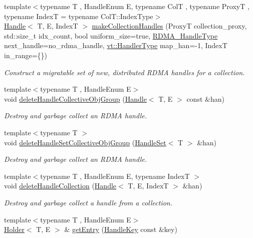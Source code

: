 \begin{DoxyCompactItemize}
{\footnotesize template$<$typename T , Handle\+Enum E, typename ColT , typename ProxyT , typename IndexT  = typename Col\+T\+::\+Index\+Type$>$ }\\\hyperlink{structvt_1_1rdma_1_1_handle}{Handle}$<$ T, E, IndexT $>$ \hyperlink{structvt_1_1rdma_1_1_manager_aad62be5c2cb0225139cf3d665b5fd7f2}{make\+Collection\+Handles} (ProxyT collection\+\_\+proxy, std\+::size\+\_\+t idx\+\_\+count, bool uniform\+\_\+size=true, \hyperlink{namespacevt_a10442579ec4e7ebef223818e64bcf908}{R\+D\+M\+A\+\_\+\+Handle\+Type} next\+\_\+handle=no\+\_\+rdma\+\_\+handle, \hyperlink{namespacevt_af64846b57dfcaf104da3ef6967917573}{vt\+::\+Handler\+Type} map\+\_\+han=-\/1, IndexT in\+\_\+range=\{\})
\begin{DoxyCompactList}\small\item\em Construct a migratable set of new, distributed R\+D\+MA handles for a collection. \end{DoxyCompactList}\item 
{\footnotesize template$<$typename T , Handle\+Enum E$>$ }\\void \hyperlink{structvt_1_1rdma_1_1_manager_a4219310feca011fd242e654c9ba51280}{delete\+Handle\+Collective\+Obj\+Group} (\hyperlink{structvt_1_1rdma_1_1_handle}{Handle}$<$ T, E $>$ const \&han)
\begin{DoxyCompactList}\small\item\em Destroy and garbage collect an R\+D\+MA handle. \end{DoxyCompactList}\item 
{\footnotesize template$<$typename T $>$ }\\void \hyperlink{structvt_1_1rdma_1_1_manager_a9b3b9bf148a8225295879481345e4af3}{delete\+Handle\+Set\+Collective\+Obj\+Group} (\hyperlink{structvt_1_1rdma_1_1_handle_set}{Handle\+Set}$<$ T $>$ \&han)
\begin{DoxyCompactList}\small\item\em Destroy and garbage collect an R\+D\+MA handle. \end{DoxyCompactList}\item 
{\footnotesize template$<$typename T , Handle\+Enum E, typename IndexT $>$ }\\void \hyperlink{structvt_1_1rdma_1_1_manager_a3a1f982e986d58e91837a2b1aa048468}{delete\+Handle\+Collection} (\hyperlink{structvt_1_1rdma_1_1_handle}{Handle}$<$ T, E, IndexT $>$ \&han)
\begin{DoxyCompactList}\small\item\em Destroy and garbage collect a handle from a collection. \end{DoxyCompactList}\item 
{\footnotesize template$<$typename T , Handle\+Enum E$>$ }\\\hyperlink{structvt_1_1rdma_1_1_holder}{Holder}$<$ T, E $>$ \& \hyperlink{structvt_1_1rdma_1_1_manager_a60c463246971a6d782e55f13fd60d092}{get\+Entry} (\hyperlink{structvt_1_1rdma_1_1_handle_key}{Handle\+Key} const \&key)
\end{DoxyCompactItemize}
